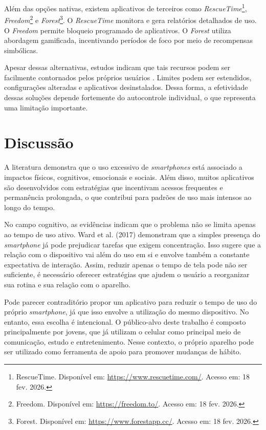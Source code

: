 Além das opções nativas, existem aplicativos de terceiros como \textit{RescueTime}\footnote{RescueTime. Disponível em: \url{https://www.rescuetime.com/}. Acesso em: 18 fev. 2026.}, \textit{Freedom}\footnote{Freedom. Disponível em: \url{https://freedom.to/}. Acesso em: 18 fev. 2026.} e \textit{Forest}\footnote{Forest. Disponível em: \url{https://www.forestapp.cc/}. Acesso em: 18 fev. 2026.}. O \textit{RescueTime} monitora e gera relatórios detalhados de uso. O \textit{Freedom} permite bloqueio programado de aplicativos. O \textit{Forest} utiliza abordagem gamificada, incentivando períodos de foco por meio de recompensas simbólicas.

Apesar dessas alternativas, estudos indicam que tais recursos podem ser facilmente contornados pelos próprios usuários \cite{chen2023}. Limites podem ser estendidos, configurações alteradas e aplicativos desinstalados. Dessa forma, a efetividade dessas soluções depende fortemente do autocontrole individual, o que representa uma limitação importante.

\section{Discussão}

A literatura demonstra que o uso excessivo de \textit{smartphones} está associado a impactos físicos, cognitivos, emocionais e sociais. Além disso, muitos aplicativos são desenvolvidos com estratégias que incentivam acessos frequentes e permanência prolongada, o que contribui para padrões de uso mais intensos ao longo do tempo.

No campo cognitivo, as evidências indicam que o problema não se limita apenas ao tempo de uso ativo. Ward et al. (2017) demonstram que a simples presença do \textit{smartphone} já pode prejudicar tarefas que exigem concentração. Isso sugere que a relação com o dispositivo vai além do uso em si e envolve também a constante expectativa de interação. Assim, reduzir apenas o tempo de tela pode não ser suficiente, é necessário oferecer estratégias que ajudem o usuário a reorganizar sua rotina e sua relação com o aparelho.

Pode parecer contraditório propor um aplicativo para reduzir o tempo de uso do próprio \textit{smartphone}, já que isso envolve a utilização do mesmo dispositivo. No entanto, essa escolha é intencional. O público-alvo deste trabalho é composto principalmente por jovens, que já utilizam o celular como principal meio de comunicação, estudo e entretenimento. Nesse contexto, o próprio aparelho pode ser utilizado como ferramenta de apoio para promover mudanças de hábito.

